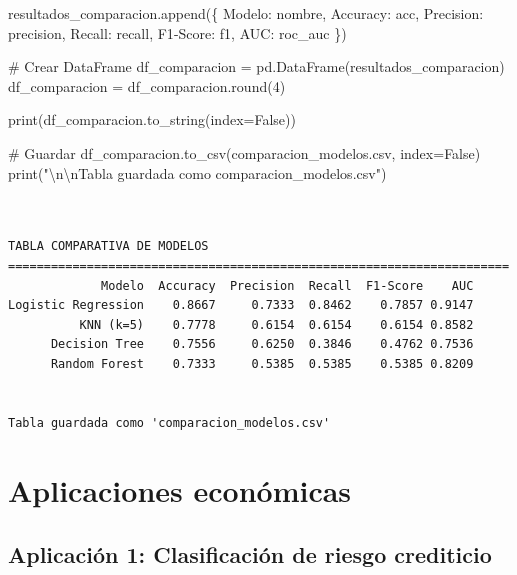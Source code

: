 \documentclass[
  doc,
  floatsintext,
  longtable,
  a4paper,
  nolmodern,
  notxfonts,
  notimes,
  12pt,
  colorlinks=true,linkcolor=blue,citecolor=blue,urlcolor=blue]{apa7}
\newenvironment{Shaded}{\begin{snugshade}}{\end{snugshade}}
\newcommand{\BuiltInTok}[1]{\textcolor[rgb]{0.00,0.23,0.31}{#1}}
\newcommand{\CharTok}[1]{\textcolor[rgb]{0.13,0.47,0.30}{#1}}
\newcommand{\CommentTok}[1]{\textcolor[rgb]{0.37,0.37,0.37}{#1}}
\newcommand{\DecValTok}[1]{\textcolor[rgb]{0.68,0.00,0.00}{#1}}
\newcommand{\NormalTok}[1]{\textcolor[rgb]{0.00,0.23,0.31}{#1}}
\newcommand{\OperatorTok}[1]{\textcolor[rgb]{0.37,0.37,0.37}{#1}}
\newcommand{\StringTok}[1]{\textcolor[rgb]{0.13,0.47,0.30}{#1}}
\newcommand{\VariableTok}[1]{\textcolor[rgb]{0.07,0.07,0.07}{#1}}
\begin{document}
\begin{Shaded}
\begin{Highlighting}[]
\NormalTok{    resultados\_comparacion.append(\{}
        \StringTok{\textquotesingle{}Modelo\textquotesingle{}}\NormalTok{: nombre,}
        \StringTok{\textquotesingle{}Accuracy\textquotesingle{}}\NormalTok{: acc,}
        \StringTok{\textquotesingle{}Precision\textquotesingle{}}\NormalTok{: precision,}
        \StringTok{\textquotesingle{}Recall\textquotesingle{}}\NormalTok{: recall,}
        \StringTok{\textquotesingle{}F1{-}Score\textquotesingle{}}\NormalTok{: f1,}
        \StringTok{\textquotesingle{}AUC\textquotesingle{}}\NormalTok{: roc\_auc}
\NormalTok{    \})}

\CommentTok{\# Crear DataFrame}
\NormalTok{df\_comparacion }\OperatorTok{=}\NormalTok{ pd.DataFrame(resultados\_comparacion)}
\NormalTok{df\_comparacion }\OperatorTok{=}\NormalTok{ df\_comparacion.}\BuiltInTok{round}\NormalTok{(}\DecValTok{4}\NormalTok{)}

\BuiltInTok{print}\NormalTok{(df\_comparacion.to\_string(index}\OperatorTok{=}\VariableTok{False}\NormalTok{))}

\CommentTok{\# Guardar}
\NormalTok{df\_comparacion.to\_csv(}\StringTok{\textquotesingle{}comparacion\_modelos.csv\textquotesingle{}}\NormalTok{, index}\OperatorTok{=}\VariableTok{False}\NormalTok{)}
\BuiltInTok{print}\NormalTok{(}\StringTok{"}\CharTok{\textbackslash{}n\textbackslash{}n}\StringTok{Tabla guardada como \textquotesingle{}comparacion\_modelos.csv\textquotesingle{}"}\NormalTok{)}
\end{Highlighting}
\end{Shaded}

\begin{verbatim}


TABLA COMPARATIVA DE MODELOS
======================================================================
             Modelo  Accuracy  Precision  Recall  F1-Score    AUC
Logistic Regression    0.8667     0.7333  0.8462    0.7857 0.9147
          KNN (k=5)    0.7778     0.6154  0.6154    0.6154 0.8582
      Decision Tree    0.7556     0.6250  0.3846    0.4762 0.7536
      Random Forest    0.7333     0.5385  0.5385    0.5385 0.8209


Tabla guardada como 'comparacion_modelos.csv'
\end{verbatim}

\section{Aplicaciones económicas}\label{aplicaciones-econuxf3micas-1}

\subsection{Aplicación 1: Clasificación de riesgo
crediticio}\label{aplicaciuxf3n-1-clasificaciuxf3n-de-riesgo-crediticio}
\end{document}

